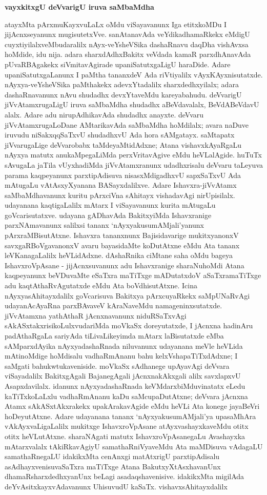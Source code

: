\bigskip
\begin{center}
{\Large\bf vayxkitxgU deVvarigU iruva saMbaMdha}
\end{center}

atayxMta pArxmuKayxvuLaLx oMdu viSayavanunx Iga etitxkoMDu I jijAcnxseyanunx mugisutetxVve. sanAtanavAda veYdikadhamaRkekx eMdigU cuyxtiyilalxveMbudaralilx nAyx-veYsheVSika dashaRnavu daqDha vishAvxsa hoMdide, idu nija. adara sharxdAdhxBakitx veVdada kamaR parxdhAnavAda pUvaRBAgakekx siVmitavAgirade upaniSatutxgaLigU haraDide. Adare upaniSatutxgaLanunx I paMtha tananxdeV Ada riVtiyalilx vAyxKAyxnisutatxde. nAyxya-veYsheVSika paMthakekx adevxYtadalilx sharxdedhxyilalx; adara dashaRnavanunx nAvu shudadhx devxYtaveMdu kareyabahudu. deVvarigU jiVvAtamxrugaLigU iruva saMbaMdha shudadhx aBeVdavalalx, BeVdABeVdavU alalx. Adare adu nirupAdhikavAda shudadhx anayxte. deVvaru jiVvAtamxrugaLoDane AMtarikavAda saMbaMdha hoMdilalx; avara naDuve iruvudu niSakxqqSaTxvU shudadhxvU Ada hora sAMgatayx. saMtapatx jiVvarugaLige deVvarobabx taMdeyaMtidAdxne; Atana vishavxkAyaRgaLu nAyxya matutx anukaMpegaLiMda perxVritavAgive eMdu heVLalAgide. huTuTx sAvugaLa jaTila vUyxhadiMda jiVvAtamxranunx udadhxrisalu deVvaru taLeyuva parama kaqpeyanunx parxtipAdisuva nisasxMdigadhxvU sapxSaTxvU Ada mAtugaLu vAtAsxyXyanana BASayxdalilxve. Adare Ishavxra-jiVvAtamx saMbaMdhavanunx kuritu pArxciVna sAhitayx vishadavAgi nirUpisilalx. udayanana kaqtigaLalilx mAtarx I viSayavanunx kurita mAtugaLu goVcarisutatxve. udayana gADhavAda BakitxyiMda Ishavxranige parxNAmavanunx salilxsi tananx `nAyxyakusumAMjali'yanunx pArxraMBisutAtxne. Ishavxra tananxnunx Bajisidavarige mukitxyanonxV savxgaRBoVgavanonxV avaru bayasidaMte koDutAtxne eMdu Ata tananx leVKanagaLalilx heVLidAdxne. dAshaRnika ciMtane saha oMdu bageya IshavxroVpAsane - jijAcnxsuvanunx adu Ishavxranige sharaNuhoMdi Atana kaqpeyanunx beVDuvaMte eSaTxra maTiTxge mADutatxdoV aSaTxramaTiTxge adu kaqtAthaRvAgutatxde eMdu Ata boVdhisutAtxne. Icina nAyxyasAhitayxdalilx goVcarisuva Bakitxya pArxcuyaRkekx saMpUNaRvAgi udayanAcAyaRna parxBAvaveV kAraNaveMdu namageninxsutatxde. jiVvAtamxna yathAthaR jAcnxnavanunx niduRSaTxvAgi sAkASxtakxrisikoLulxvudariMda moVkaSx doreyutatxde, I jAcnxna hadinAru padAthaRgaLa sariyAda tiLivaLikeyimda mAtarx laBisutatxde eMba sAMparxdAyika nAyxyadashaRnada niluvanunx udayanana meVle heVLida mAtinoMdige hoMdisalu vadhaRmAnanu bahu kelxVshapaTiTxdAdxne; I saMgati bahukwtukaveniside. moVkaSx sAdhanege upAyavAgi deVvara viSayadalilx BakitxgAgali BajanegAgali jAcnxnakAkxgali alilx savxlapxvU Asapxdavilalx. idanunx nAyxyadashaRnada keVMdarxbiMduvinatatx eLedu kaTiTxkoLaLxlu vadhaRmAnanu kaDu saMcupaDutAtxne; deVvara jAcnxna Atamx sAkASxtAkxrakekx upakArakavAgide eMdu heVLi Ata konege jayaBeVri hoDeyutAtxne. Adare udayanana tananx `nAyxyakusumAMjali'ya upasaMhAra vAkAyxvaLigaLalilx mukitxge IshavxroVpAsane atAyxvashayxkaveMdu otitx otitx heVLutAtxne. sharaNAgati matutx IshavxroVpAsanegaLu Avashayxka mAtarxvalalx tAkiRkavAgiyU samathaRniVyaveMdu Ata maMDisuva vAdagaLU samathaRnegaLU idakikxMta cenAnxgi matAtxrigU parxtipAdisalu asAdhayxvenisuvaSaTxra maTiTxge Atana BakutxyXtAsxhavanUnx dhamaRsharxdedhxyanUnx beLagi asadaqshavenisive. idakikxMta migilAda deYvAsitxkayxvAdavanunx UhisuvudU kaSaTx. vishavxsAhitayxdalilx 